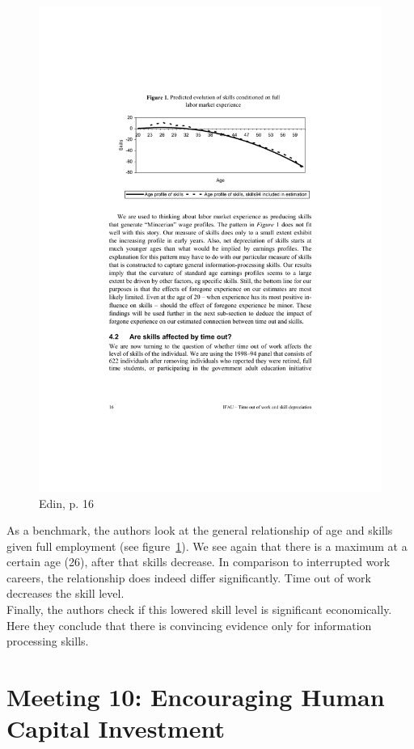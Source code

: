 \documentclass[12pt,a4paper]{article}
\begin{document}
  \begin{figure}[ht]
        \centering
        \includegraphics[width=12cm]{edin_age.pdf}
        \caption{Edin, p. 16}
        \label{edin_age}
  \end{figure}

  As a benchmark, the authors look at the general relationship of age and skills given full employment (see figure~\ref{edin_age}).
  We see again that there is a maximum at a certain age (26), after that skills decrease. In comparison to interrupted work
  careers, the relationship does indeed differ significantly. Time out of work decreases the skill level.\\
  Finally, the authors check if this lowered skill level is significant economically. Here they conclude that there is convincing
  evidence only for information processing skills. 


  \section{Meeting 10: Encouraging Human Capital Investment} %
    \label{sec:Meeting 10}
\end{document}
